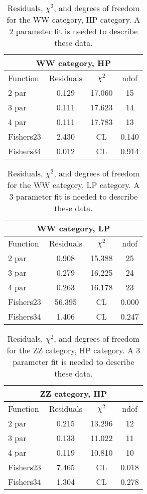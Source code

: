 \begin{table}[htb]
\centering
\begin{tabular}{|l c c c |}
\hline
\multicolumn{4}{|c|}{WW category, HP}\\
\hline
Function & Residuals & $\chi^2$ & ndof \\
\hline
2 par & 0.129 & 17.060 & 15 \\
3 par & 0.111 & 17.623 & 14 \\
4 par & 0.111 & 17.783 & 13 \\
\hline
\hline
Fishers23  & 2.430 & CL &0.140\\
Fishers34  & 0.012 & CL &0.914\\
\hline
\end{tabular}
\caption{Residuals, $\chi^{2}$, and degrees of freedom for the WW category, HP category. A 2 parameter fit is needed to describe these data.}
\label{tab:WW category, HP}
\end{table}
\begin{table}[htb]
\centering
\begin{tabular}{|l c c c |}
\hline
\multicolumn{4}{|c|}{WW category, LP}\\
\hline
Function & Residuals & $\chi^2$ & ndof \\
\hline
2 par & 0.908 & 15.388 & 25 \\
3 par & 0.279 & 16.225 & 24 \\
4 par & 0.263 & 16.178 & 23 \\
\hline
\hline
Fishers23  & 56.395 & CL &0.000\\
Fishers34  & 1.406 & CL &0.247\\
\hline
\end{tabular}
\caption{Residuals, $\chi^{2}$, and degrees of freedom for the WW category, LP category. A 3 parameter fit is needed to describe these data.}
\label{tab:WW category, LP}
\end{table}
\begin{table}[htb]
\centering
\begin{tabular}{|l c c c |}
\hline
\multicolumn{4}{|c|}{ZZ category, HP}\\
\hline
Function & Residuals & $\chi^2$ & ndof \\
\hline
2 par & 0.215 & 13.296 & 12 \\
3 par & 0.133 & 11.022 & 11 \\
4 par & 0.119 & 10.810 & 10 \\
\hline
\hline
Fishers23  & 7.465 & CL &0.018\\
Fishers34  & 1.304 & CL &0.278\\
\hline
\end{tabular}
\caption{Residuals, $\chi^{2}$, and degrees of freedom for the ZZ category, HP category. A 3 parameter fit is needed to describe these data.}
\label{tab:ZZ category, HP}
\end{table}
